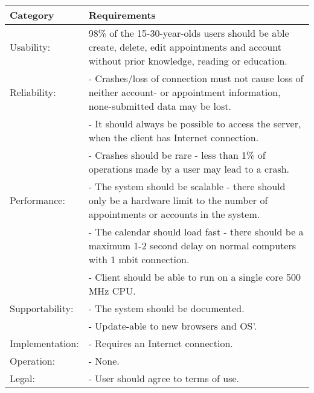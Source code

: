 {\tabulinesep=1.2mm
\begin{tabu}{ | p{3cm} | p{13cm} |}
    \hline
    Category	 			& 		Requirements \\\hline
    Usability:	  			& 		98\% of the 15-30-year-olds users should be able create, delete, edit appointments and account without prior knowledge, reading or education. \\\hline
    Reliability: 			& 		- Crashes/loss of connection must not cause loss of neither account- or appointment information, none-submitted data may be lost. \\
							&		- It should always be possible to access the server, when the client has Internet connection.\\
							&		- Crashes should be rare - less than 1\% of operations made by a user may lead to a crash. \\ \hline
	Performance:			&		- The system should be scalable - there should only be a hardware limit to the number of appointments or accounts in the system.\\
							&		- The calendar should load fast - there should be a maximum 1-2 second delay on normal computers with 1 mbit connection.\\
							&		- Client should be able to run on a single core 500 MHz CPU.\\ \hline
    Supportability: 		& 		- The system should be documented.  \\
    						&		- Update-able to new browsers and OS'. \\ \hline
	Implementation: 		&		- Requires an Internet connection.\\\hline
	Operation:				&	 	- None. \\\hline
	Legal:					&		- User should agree to terms of use.\\\hline
\end{tabu}
}
